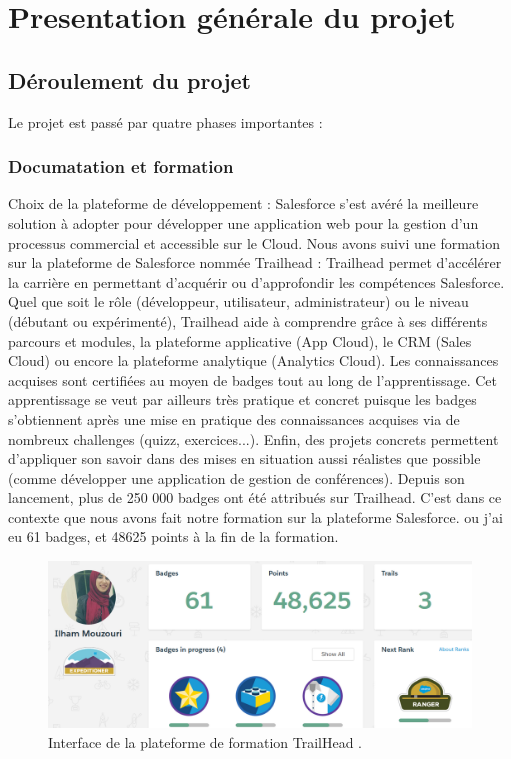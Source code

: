\documentclass[a4paper, 12pt]{report}
\begin{document}
\section{Presentation générale du projet}
\subsection {Déroulement du projet}
Le projet est passé par quatre phases importantes : 
\subsubsection {Documatation et formation}
	 Choix de la plateforme de développement :  Salesforce s'est avéré la meilleure solution à adopter pour développer une application web pour la gestion d'un processus commercial et accessible sur le Cloud.
 Nous avons suivi une   formation sur la plateforme de Salesforce nommée Trailhead : Trailhead permet d'accélérer la carrière en permettant d'acquérir ou d'approfondir les compétences Salesforce. Quel que soit le rôle (développeur, utilisateur, administrateur) ou le niveau (débutant ou expérimenté), Trailhead aide à comprendre grâce à ses différents parcours et modules, la plateforme applicative (App Cloud), le CRM (Sales Cloud) ou encore la plateforme analytique (Analytics Cloud). Les connaissances acquises sont certifiées au moyen de badges tout au long de l'apprentissage. Cet apprentissage se veut par ailleurs très pratique et concret puisque les badges s'obtiennent après une mise en pratique des connaissances acquises via de nombreux challenges (quizz, exercices...). Enfin, des projets concrets permettent d'appliquer son savoir dans des mises en situation aussi réalistes que possible (comme développer une application de gestion de conférences). Depuis son lancement, plus de 250 000 badges ont été attribués sur Trailhead. 
C'est dans ce contexte que nous avons fait notre formation sur la plateforme Salesforce. ou j'ai eu 61 badges, et 48625 points à la fin de la formation. 

\begin{figure}[H]
\centering
\includegraphics[scale=0.31]{rank.png}
\caption{Interface de la plateforme de formation TrailHead .}
\end{figure}
\end{document}
